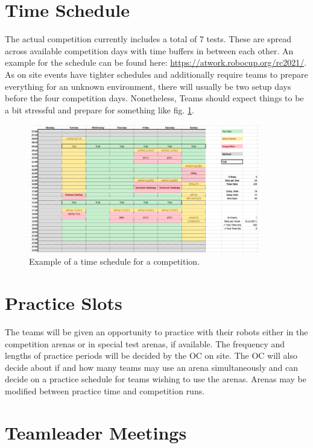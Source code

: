 \section{Time Schedule}

The actual competition currently includes a total of 7 tests.
These are spread across available competition days with time buffers in between each other.
An example for the schedule can be found here: \url{https://atwork.robocup.org/rc2021/}.
As on site events have tighter schedules and additionally require teams to prepare everything for an unknown environment, there will usually be two setup days before the four competition days.
Nonetheless, Teams should expect things to be a bit stressful and prepare for something like fig. \ref{fig:example_schedule}.

\begin{figure}[h!]
\centering
\includegraphics[width= 0.9\textwidth ]{./images/competition/Competition_Schedule_2024}
\caption{Example of a time schedule for a \RCAW competition.}
\label{fig:example_schedule}
\end{figure}


\section{Practice Slots}

The teams will be given an opportunity to practice with their robots either in the competition arenas or in special test arenas, if available. The frequency and lengths of practice periods will be decided by the OC on site. The OC will also decide about if and how many teams may use an arena simultaneously and can decide on a practice schedule for teams wishing to use the arenas. Arenas may be modified between practice time and competition runs.

\section{Teamleader Meetings}

